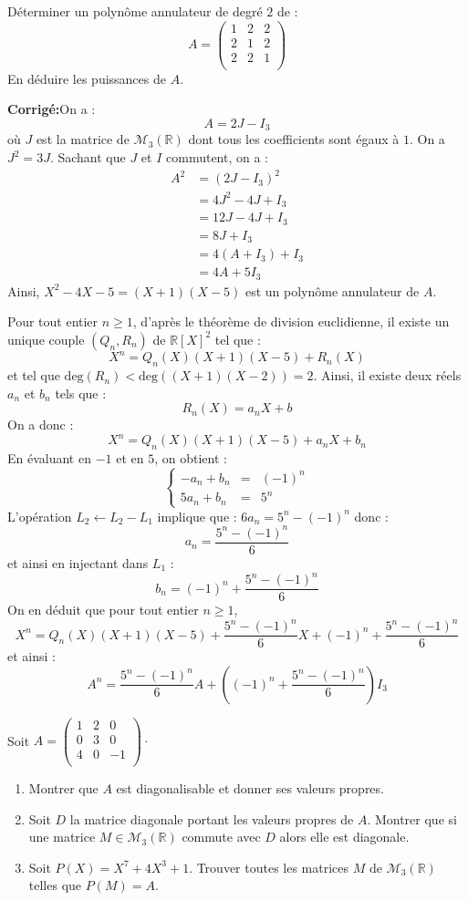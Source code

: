 \documentclass[a4paper,twoside,french,10pt]{VcCours}
\newcommand{\corr}{\textbf{Corrigé:}}
\begin{document}
\begin{Exercice}{} Déterminer un polynôme annulateur de degré $2$ de :
$$ A = \begin{pmatrix}
1 & 2 & 2 \\
2 & 1 & 2 \\
2 & 2 & 1 \\
\end{pmatrix}$$
En déduire les puissances de $A$. 
\end{Exercice}

\corr On a :
$$ A= 2J-I_3$$
où $J$ est la matrice de $\mathcal{M}_3(\mathbb{R})$ dont tous les coefficients sont égaux à $1$. On a $J^2=3J$. Sachant que $J$ et $I$ commutent, on a :
\begin{align*}
A^2 & = (2J-I_3)^2 \\
& = 4J^2 - 4J+ I_3 \\
& = 12J-4J+I_3 \\
& = 8J+I_3 \\
& = 4(A+I_3) + I_3 \\
& = 4A +5I_3
\end{align*}
Ainsi, $X^2-4X-5=(X+1)(X-5)$ est un polynôme annulateur de $A$.


Pour tout entier $n \geq 1$, d'après le théorème de division euclidienne, il existe un unique couple $(Q_n,R_n)$ de $\mathbb{R}[X]^2$ tel que :
$$ X^n = Q_n(X) (X+1)(X-5) + R_n(X)$$
et tel que $\textrm{deg}(R_n)<\textrm{deg}((X+1)(X-2))=2$. Ainsi, il existe deux réels $a_n$ et $b_n$ tels que :
$$ R_n(X)= a_n X + b$$
On a donc :
$$ X^n = Q_n(X) (X+1)(X-5) + a_n X + b_n$$
En évaluant en $-1$ et en $5$, on obtient :
$$ \left\lbrace \begin{array}{ccl}
-a_n + b_n & = & (-1)^n \\
5a_n + b_n & = & 5^n
\end{array}\right.$$
L'opération $L_2 \leftarrow L_2- L_1$ implique que : $6 a_n = 5^n - (-1)^n$ donc :
$$ a_n = \dfrac{5^n-(-1)^n}{6}$$
et ainsi en injectant dans $L_1$ :
$$ b_n = (-1)^n + \dfrac{5^n-(-1)^n}{6}$$
On en déduit que pour tout entier $n \geq 1$,
$$ X^n = Q_n(X) (X+1)(X-5) +\dfrac{5^n-(-1)^n}{6}  X + (-1)^n + \dfrac{5^n-(-1)^n}{6}$$
et ainsi :
$$ A^n = \dfrac{5^n-(-1)^n}{6}  A + \left((-1)^n + \dfrac{5^n-(-1)^n}{6}\right) I_3$$


\begin{Exercice}{}Soit $A= \begin{pmatrix}
1 & 2 & 0 \\
0 & 3 & 0 \\
4 & 0 & -1 \\
\end{pmatrix}\cdot$
\begin{enumerate}
\item Montrer que $A$ est diagonalisable et donner ses valeurs propres.
\item Soit $D$ la matrice diagonale portant les valeurs propres de $A$. Montrer que si une matrice $M \in \mathcal{M}_3(\mathbb{R})$ commute avec $D$ alors elle est diagonale.
\item Soit $P(X)=X^7+ 4X^3+1$. Trouver toutes les matrices $M$ de $\mathcal{M}_3(\mathbb{R})$ telles que $P(M)=A$.
\end{enumerate}
\end{Exercice}
\end{document}

